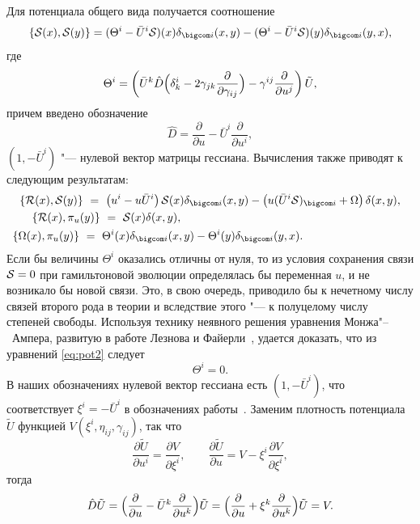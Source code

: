 Для потенциала общего вида получается соотношение
$$
\{
{\cal S}(x),{\cal S}(y)
\}
=
 (\Theta^i-\bar U^i{\cal S})(x)\delta_{\bigcom i}(x,y)-(\Theta^i-\bar U^i{\cal S})(y)\delta_{\bigcom  i}(y,x),
$$
где
\begin{equation}
\Theta^i =
\left(\bar U^k\hat{D}
\Bigl(\delta^i_k-2\gamma_{jk}\frac{\partial}{\partial\gamma_{ij}} \Bigr)-\gamma^{ij}\frac{\partial}{\partial u^j}\right)\tilde U,%
\end{equation}
причем введено обозначение
$$
\hat{D}=\frac{\partial}{\partial u}-\bar U^i\frac{\partial}{\partial u^i},
$$
$(1,-\bar U^i)$ "--- нулевой вектор матрицы гессиана. 
Вычисления также приводят к следующим результатам:
\begin{gather}
\{{\cal R}(x),{\cal S}(y)\}~=~\left(u^i- u\bar U^i\right){\cal S}(x)\delta_{\bigcom i}(x,y)-\left( u(\bar U^i{\cal S})_{\bigcom i}+\Omega\right)\delta(x,y),
\\
\{{\cal R}(x),\pi_u(y)\}~=~{\cal S}(x)\delta(x,y), \hspace{6.45cm} \\
\{\Omega(x),\pi_u(y)\}~=~\Theta^i(x)\delta_{\bigcom i}(x,y)-\Theta^i(y)\delta_{\bigcom i}(y,x). \hspace{3.25cm} \label{eq:ThetaOmega}
\end{gather}
Если бы величины $\Theta^i$ оказались отличны от нуля, то из условия сохранения связи ${\cal S}=0$ при гамильтоновой эволюции определялась бы переменная $u$, и не возникало бы новой связи. 
Это, в свою очередь, приводило бы к нечетному числу связей второго рода в теории и вследствие этого "--- к полуцелому числу степеней свободы. 
Используя технику неявного решения уравнения Монжа"--~Ампера, развитую в работе Лезнова и Файерли~\cite{Leznov}, удается доказать, что из уравнений \eqref{eq:pot2} следует 
\begin{equation}
\Theta^i=0. \label{eq:Theta}
\end{equation}
В наших обозначениях нулевой вектор гессиана есть
$(1,-\bar U^i)$, что соответствует   $\xi^i=-\bar U^i$ в обозначениях работы~\cite{Leznov}.
Заменим плотность потенциала $\tilde U$ функцией $V(\xi^i,\eta_{ij},\gamma_{ij})$, так что
$$
\frac{\partial\tilde U}{\partial u^i}=\frac{\partial V}{\partial \xi^i},\qquad \frac{\partial\tilde U}{\partial u}=V-\xi^i\frac{\partial V}{\partial \xi^i},
$$
тогда
\begin{equation}
\hat D\tilde U= \Bigl(\frac{\partial}{\partial u}-\bar U^k\frac{\partial}{\partial u^k}\Bigr)
\tilde U=\Bigl(\frac{\partial}{\partial u}+\xi^k\frac{\partial}{\partial u^k}\Bigr)\tilde U=V.
\label{eq:VDU}
\end{equation}
